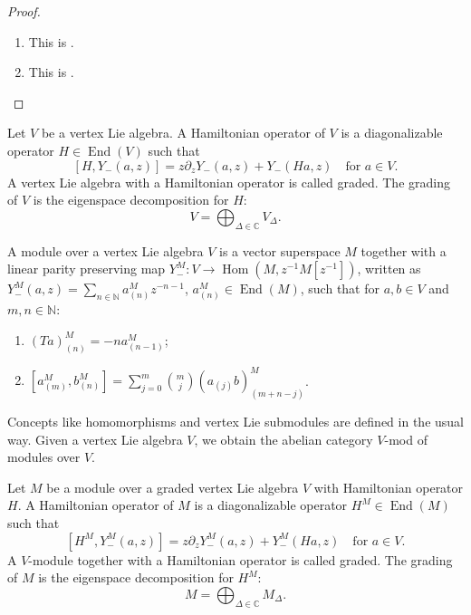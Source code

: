 \documentclass[a4paper, 12pt, reqno]{amsart}
\theoremstyle{remark}
\numberwithin{equation}{subsection}
\DeclareMathOperator{\End}{End}
\DeclareMathOperator{\Hom}{Hom}
\begin{document}
\begin{proof}\leavevmode
  \begin{enumerate}
  \item This is .
  \item This is . \qedhere
  \end{enumerate}
\end{proof}

Let $V$ be a vertex Lie algebra.
A Hamiltonian operator of $V$ is a diagonalizable operator $H \in \End(V)$ such that
\begin{equation}
  \label{eq:42}
  [H, Y_-(a, z)] = z\partial_zY_-(a, z) + Y_-(Ha, z) \quad \text{for }a \in V.
\end{equation}
A vertex Lie algebra with a Hamiltonian operator is called graded.
The grading of $V$ is the eigenspace decomposition for $H$:
\begin{equation*}
  V = \bigoplus_{\Delta \in \mathbb{C}}V_{\Delta}.
\end{equation*}

A module over a vertex Lie algebra $V$ is a vector superspace $M$ together with a linear parity preserving map $Y^M_-: V \to \Hom(M, z^{-1}M[z^{-1}])$, written as $Y^M_-(a, z) = \sum_{n \in \mathbb{N}}a^M_{(n)}z^{-n - 1}$, $a^M_{(n)} \in \End(M)$, such that for $a, b \in V$ and $m, n \in \mathbb{N}$:
\begin{enumerate}
\item $(Ta)^M_{(n)} = -na^M_{(n - 1)}$;
\item $[a^M_{(m)}, b^M_{(n)}] = \sum_{j = 0}^m\binom{m}{j}(a_{(j)}b)^M_{(m + n - j)}$.
\end{enumerate}
Concepts like homomorphisms and vertex Lie submodules are defined in the usual way.
Given a vertex Lie algebra $V$, we obtain the abelian category $V$-mod of modules over $V$.

Let $M$ be a module over a graded vertex Lie algebra $V$ with Hamiltonian operator $H$. 
A Hamiltonian operator of $M$ is a diagonalizable operator $H^M \in \End(M)$ such that
\begin{equation}
  \label{eq:43}
  [H^M, Y^M_-(a, z)] = z\partial_zY^M_-(a, z) + Y^M_-(Ha, z) \quad \text{for }a \in V.
\end{equation}
A $V$-module together with a Hamiltonian operator is called graded.
The grading of $M$ is the eigenspace decomposition for $H^M$:
\begin{equation*}
  M = \bigoplus_{\Delta \in \mathbb{C}}M_{\Delta}.
\end{equation*}
\end{document}
